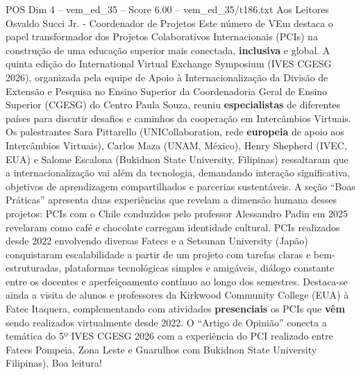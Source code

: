 \begin{textsample}{POS Dim 4 – vem\_ed\_35 – Score 6.00 – vem\_ed\_35/t186.txt}  \label{ex:f4_pos_005}
Aos Leitores Osvaldo Succi Jr. - Coordenador de Projetos Este número de VEm destaca o papel transformador dos Projetos Colaborativos Internacionais (PCIs) na construção de uma educação superior mais conectada, \textbf{inclusiva} e global.
A quinta edição do International Virtual Exchange Symposium (IVES CGESG 2026), organizada pela equipe de Apoio à Internacionalização da Divisão de Extensão e Pesquisa no Ensino Superior da Coordenadoria Geral de Ensino Superior (CGESG) do Centro Paula Souza, reuniu \textbf{especialistas} de diferentes países para discutir desafios e caminhos da cooperação em Intercâmbios Virtuais.
Os palestrantes Sara Pittarello (UNICollaboration, rede \textbf{europeia} de apoio aos Intercâmbios Virtuais), Carlos Maza (UNAM, México), Henry Shepherd (IVEC, EUA) e Salome Escalona (Bukidnon State University, Filipinas) ressaltaram que a internacionalização vai além da tecnologia, demandando interação significativa, objetivos de aprendizagem compartilhados e parcerias sustentáveis.
A seção “Boas Práticas” apresenta duas experiências que revelam a dimensão humana desses projetos: PCIs com o Chile conduzidos pelo professor Alessandro Padin em 2025 revelaram como café e chocolate carregam identidade cultural.
PCIs realizados desde 2022 envolvendo diversas Fatecs e a Setsunan University (Japão) conquistaram escalabilidade a partir de um projeto com tarefas claras e bem-estruturadas, plataformas tecnológicas simples e amigáveis, diálogo constante entre os docentes e aperfeiçoamento contínuo ao longo dos semestres.
Destaca-se ainda a visita de alunos e professores da Kirkwood Community College (EUA) à Fatec Itaquera, complementando com atividades \textbf{presenciais} os PCIs que \textbf{vêm} sendo realizados virtualmente desde 2022.
O “Artigo de Opinião” conecta a temática do 5º IVES CGESG 2026 com a experiência do PCI realizado entre Fatecs Pompeia, Zona Leste e Guarulhos com Bukidnon State University Filipinas).
Boa leitura!

\end{textsample}
